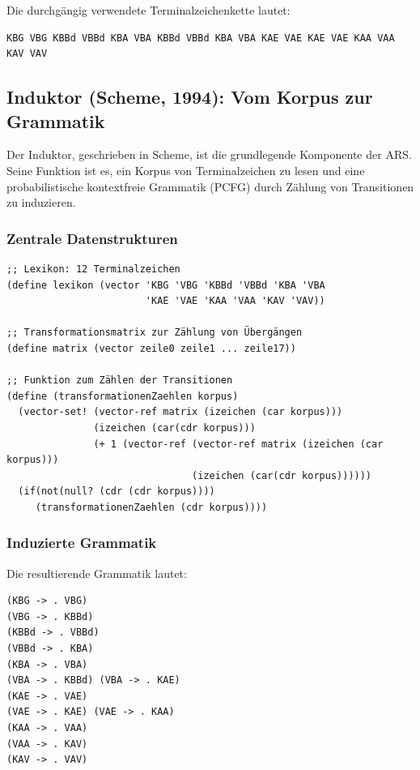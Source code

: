 \documentclass[12pt,a4paper]{article}
\begin{document}
Die durchgängig verwendete Terminalzeichenkette lautet:

\begin{verbatim}
KBG VBG KBBd VBBd KBA VBA KBBd VBBd KBA VBA KAE VAE KAE VAE KAA VAA KAV VAV
\end{verbatim}

\subsection{Induktor (Scheme, 1994): Vom Korpus zur Grammatik}

Der Induktor, geschrieben in Scheme, ist die grundlegende Komponente der ARS. 
Seine Funktion ist es, ein Korpus von Terminalzeichen zu lesen und eine 
probabilistische kontextfreie Grammatik (PCFG) durch Zählung von Transitionen 
zu induzieren.

\subsubsection{Zentrale Datenstrukturen}

\begin{lstlisting}[caption=Lexikon und Transformationsmatrix in Scheme]
;; Lexikon: 12 Terminalzeichen
(define lexikon (vector 'KBG 'VBG 'KBBd 'VBBd 'KBA 'VBA 
                        'KAE 'VAE 'KAA 'VAA 'KAV 'VAV))

;; Transformationsmatrix zur Zählung von Übergängen
(define matrix (vector zeile0 zeile1 ... zeile17))

;; Funktion zum Zählen der Transitionen
(define (transformationenZaehlen korpus)
  (vector-set! (vector-ref matrix (izeichen (car korpus))) 
               (izeichen (car(cdr korpus))) 
               (+ 1 (vector-ref (vector-ref matrix (izeichen (car korpus))) 
                                (izeichen (car(cdr korpus))))))
  (if(not(null? (cdr (cdr korpus))))
     (transformationenZaehlen (cdr korpus))))
\end{lstlisting}

\subsubsection{Induzierte Grammatik}

Die resultierende Grammatik lautet:

\begin{verbatim}
(KBG -> . VBG)
(VBG -> . KBBd)
(KBBd -> . VBBd)
(VBBd -> . KBA)
(KBA -> . VBA)
(VBA -> . KBBd) (VBA -> . KAE)
(KAE -> . VAE)
(VAE -> . KAE) (VAE -> . KAA)
(KAA -> . VAA)
(VAA -> . KAV)
(KAV -> . VAV)
\end{verbatim}
\end{document}
